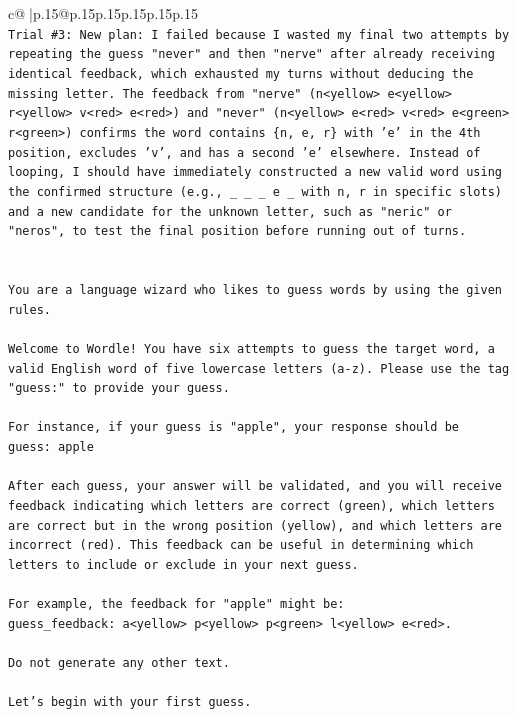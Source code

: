 \documentclass{article}
\begin{document}
{\begin{supertabular}{c@{$\;$}|p{.15\linewidth}@{}p{.15\linewidth}p{.15\linewidth}p{.15\linewidth}p{.15\linewidth}p{.15\linewidth}}
{{{\\ 
\texttt{Trial \#3: New plan: I failed because I wasted my final two attempts by repeating the guess "never" and then "nerve" after already receiving identical feedback, which exhausted my turns without deducing the missing letter. The feedback from "nerve" (n<yellow> e<yellow> r<yellow> v<red> e<red>) and "never" (n<yellow> e<red> v<red> e<green> r<green>) confirms the word contains \{n, e, r\} with 'e' in the 4th position, excludes 'v', and has a second 'e' elsewhere. Instead of looping, I should have immediately constructed a new valid word using the confirmed structure (e.g., \_ \_ \_ e \_ with n, r in specific slots) and a new candidate for the unknown letter, such as "neric" or "neros", to test the final position before running out of turns.} \\
\\ 
\\ 
\texttt{You are a language wizard who likes to guess words by using the given rules.} \\
\\ 
\texttt{Welcome to Wordle! You have six attempts to guess the target word, a valid English word of five lowercase letters (a{-}z). Please use the tag "guess:" to provide your guess.} \\
\\ 
\texttt{For instance, if your guess is "apple", your response should be} \\
\texttt{guess: apple} \\
\\ 
\texttt{After each guess, your answer will be validated, and you will receive feedback indicating which letters are correct (green), which letters are correct but in the wrong position (yellow), and which letters are incorrect (red). This feedback can be useful in determining which letters to include or exclude in your next guess.} \\
\\ 
\texttt{For example, the feedback for "apple" might be:} \\
\texttt{guess\_feedback: a<yellow> p<yellow> p<green> l<yellow> e<red>.} \\
\\ 
\texttt{Do not generate any other text.} \\
\\ 
\texttt{Let's begin with your first guess.} \\
            }
        }
    }
     \\ \\


\end{supertabular}}
\end{document}
